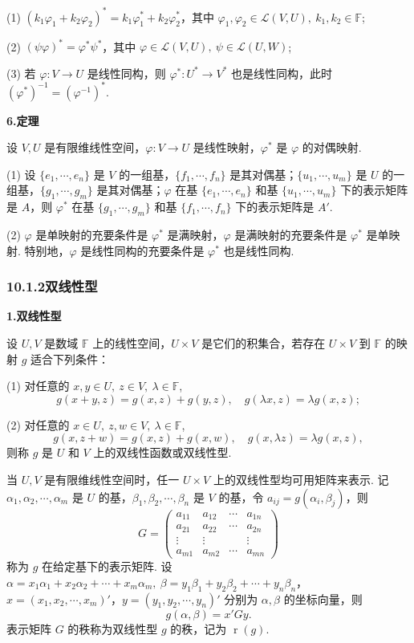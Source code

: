 \documentclass[UTF8,12pt,a4paper,fontset=fandol]{ctexart}
\begin{document}
(1) $(k_1\varphi_1+k_2\varphi_2)^*=k_1\varphi_1^*+k_2\varphi_2^*$，其中 $\varphi_1,\varphi_2\in\mathcal{L}(V,U),\ k_1,k_2\in\mathbb{F}$;

(2) $(\psi\varphi)^*=\varphi^*\psi^*$，其中 $\varphi\in\mathcal{L}(V,U),\ \psi\in\mathcal{L}(U,W)$;

(3) 若 $\varphi:V\to U$ 是线性同构，则 $\varphi^*:U^*\to V^*$ 也是线性同构，此时 $(\varphi^*)^{-1}=(\varphi^{-1})^*$.

\noindent\textbf{6.\quad 定理}

设 $V,U$ 是有限维线性空间，$\varphi:V\to U$ 是线性映射，$\varphi^*$ 是 $\varphi$ 的对偶映射.

(1) 设 $\{e_1,\cdots,e_n\}$ 是 $V$ 的一组基，$\{f_1,\cdots,f_n\}$ 是其对偶基；$\{u_1,\cdots,u_m\}$ 是 $U$ 的一组基，$\{g_1,\cdots,g_m\}$ 是其对偶基；$\varphi$ 在基 $\{e_1,\cdots,e_n\}$ 和基 $\{u_1,\cdots,u_m\}$ 下的表示矩阵是 $A$，则 $\varphi^*$ 在基 $\{g_1,\cdots,g_m\}$ 和基 $\{f_1,\cdots,f_n\}$ 下的表示矩阵是 $A'$.

(2) $\varphi$ 是单映射的充要条件是 $\varphi^*$ 是满映射，$\varphi$ 是满映射的充要条件是 $\varphi^*$ 是单映射. 特别地，$\varphi$ 是线性同构的充要条件是 $\varphi^*$ 也是线性同构.

\subsubsection*{10.1.2\quad 双线性型}

\noindent\textbf{1.\quad 双线性型}

设 $U,V$ 是数域 $\mathbb{F}$ 上的线性空间，$U\times V$ 是它们的积集合，若存在 $U\times V$ 到 $\mathbb{F}$ 的映射 $g$ 适合下列条件：

(1) 对任意的 $x,y\in U,\ z\in V,\ \lambda\in\mathbb{F}$,
\[
g(x+y,z)=g(x,z)+g(y,z),\quad g(\lambda x,z)=\lambda g(x,z);
\]

(2) 对任意的 $x\in U,\ z,w\in V,\ \lambda\in\mathbb{F}$,
\[
g(x,z+w)=g(x,z)+g(x,w),\quad g(x,\lambda z)=\lambda g(x,z),
\]
则称 $g$ 是 $U$ 和 $V$ 上的双线性函数或双线性型.

当 $U,V$ 是有限维线性空间时，任一 $U\times V$ 上的双线性型均可用矩阵来表示. 记 $\alpha_1,\alpha_2,\cdots,\alpha_m$ 是 $U$ 的基，$\beta_1,\beta_2,\cdots,\beta_n$ 是 $V$ 的基，令 $a_{ij}=g(\alpha_i,\beta_j)$，则
\[
G=\left(\begin{array}{cccc}
a_{11} & a_{12} & \cdots & a_{1n}\\
a_{21} & a_{22} & \cdots & a_{2n}\\
\vdots & \vdots &        & \vdots\\
a_{m1} & a_{m2} & \cdots & a_{mn}
\end{array}\right)
\]
称为 $g$ 在给定基下的表示矩阵. 设 $\alpha=x_1\alpha_1+x_2\alpha_2+\cdots+x_m\alpha_m,\ \beta=y_1\beta_1+y_2\beta_2+\cdots+y_n\beta_n$，$x=(x_1,x_2,\cdots,x_m)'$，$y=(y_1,y_2,\cdots,y_n)'$ 分别为 $\alpha,\beta$ 的坐标向量，则
\[
g(\alpha,\beta)=x'Gy.
\]
表示矩阵 $G$ 的秩称为双线性型 $g$ 的秩，记为 $\operatorname{r}(g)$.
\end{document}
